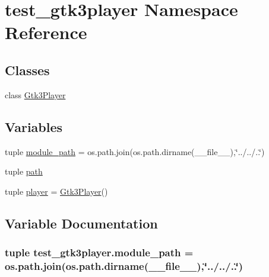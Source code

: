 \hypertarget{namespacetest__gtk3player}{}\section{test\+\_\+gtk3player Namespace Reference}
\label{namespacetest__gtk3player}
\subsection*{Classes}
\begin{DoxyCompactItemize}
\item 
class \hyperlink{classtest__gtk3player_1_1Gtk3Player}{Gtk3\+Player}
\end{DoxyCompactItemize}
\subsection*{Variables}
\begin{DoxyCompactItemize}
\item 
tuple \hyperlink{namespacetest__gtk3player_ad5c6717fcffd3b1b68662f333d5f55da}{module\+\_\+path} = os.\+path.\+join(os.\+path.\+dirname(\+\_\+\+\_\+file\+\_\+\+\_\+),\char`\"{}../../..\char`\"{})
\item 
tuple \hyperlink{namespacetest__gtk3player_a417dbddeb3297fcadfb05a2bb3820eda}{path}
\item 
tuple \hyperlink{namespacetest__gtk3player_a835702f63626351e522ef6aec9f0a9e2}{player} = \hyperlink{classtest__gtk3player_1_1Gtk3Player}{Gtk3\+Player}()
\end{DoxyCompactItemize}


\subsection{Variable Documentation}
\hypertarget{namespacetest__gtk3player_ad5c6717fcffd3b1b68662f333d5f55da}{}
\subsubsection[{module\+\_\+path}]{\setlength{\rightskip}{0pt plus 5cm}tuple test\+\_\+gtk3player.\+module\+\_\+path = os.\+path.\+join(os.\+path.\+dirname(\+\_\+\+\_\+file\+\_\+\+\_\+),\char`\"{}../../..\char`\"{})}\label{namespacetest__gtk3player_ad5c6717fcffd3b1b68662f333d5f55da}
\hypertarget{namespacetest__gtk3player_a417dbddeb3297fcadfb05a2bb3820eda}{}
